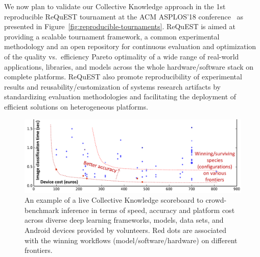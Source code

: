 We now plan to validate our Collective Knowledge approach
in the 1st reproducible ReQuEST tournament 
at the ACM ASPLOS'18 conference~\cite{request}
as presented in Figure~\ref{fig:reproducible-tournaments}.
%
ReQuEST is aimed at providing a scalable tournament framework, 
a common experimental methodology and an open repository for continuous evaluation 
and optimization of the quality vs.\ efficiency Pareto optimality of a wide range 
of real-world applications, libraries, and models across the whole 
hardware/software stack on complete platforms. 
%
ReQuEST also promote reproducibility of experimental results and reusability/customization 
of systems research artifacts by standardizing evaluation methodologies and facilitating 
the deployment of efficient solutions on heterogeneous platforms. 

   \begin{figure}[!htbp]
     \centering
      \includegraphics[width=5in]
      {ck-assets/32c0b60dcc114aa8-cropped.pdf} %
     \caption{
      An example of a live Collective Knowledge scoreboard to crowd-benchmark
      inference in terms of speed, accuracy and platform cost 
      across diverse deep learning frameworks, models, data sets, and 
      Android devices provided by volunteers. Red dots 
      are associated with the winning workflows (model/software/hardware)
      on different frontiers.
     }
     \vspace{-1em}
     \label{fig:dnn-crowdtuning-example}
   \end{figure}

